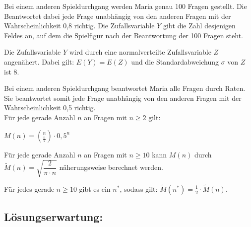 \begin{langesbeispiel}
\begin{aufgabenstellung}

\item Bei einem anderen Spieldurchgang werden Maria genau 100 Fragen gestellt. Die Beantwortet dabei jede Frage unabhängig von den anderen Fragen mit der Wahrscheinlichkeit 0,8 richtig. Die Zufallsvariable $Y$ gibt die Zahl desjenigen Feldes an, auf dem die Spielfigur nach der Beantwortung der 100 Fragen steht.%


Die Zufallsvariable $Y$ wird durch eine normalverteilte Zufallsvariable $Z$ angenähert. Dabei gilt: $E(Y)=E(Z)$ und die Standardabweichung $\sigma$ von $Z$ ist 8.


\item Bei einem anderen Spieldurchgang beantwortet Maria alle Fragen durch Raten. Sie beantwortet somit jede Frage unabhängig von den anderen Fragen mit der Wahrscheinlichkeit 0,5 richtig.\\
Für jede gerade Anzahl $n$ an Fragen mit $n\geq 2$ gilt:

$M(n)=\binom{n}{\frac{n}{2}}\cdot 0,5^n$%


Für jede gerade Anzahl $n$ an Fragen mit $n\geq 10$ kann $M(n)$ durch\\
 $\widetilde{M}(n)=\sqrt{\dfrac{2}{\pi\cdot n}}$ näherungsweise berechnet werden.

Für jedes gerade $n\geq 10$ gibt es ein $n^*$, sodass gilt: $\widetilde{M}(n^*)=\frac{1}{2}\cdot \widetilde{M}(n)$.


\end{aufgabenstellung}

\begin{loesung}
\item \subsection{Lösungserwartung:} 


\end{loesung}
\end{langesbeispiel}
